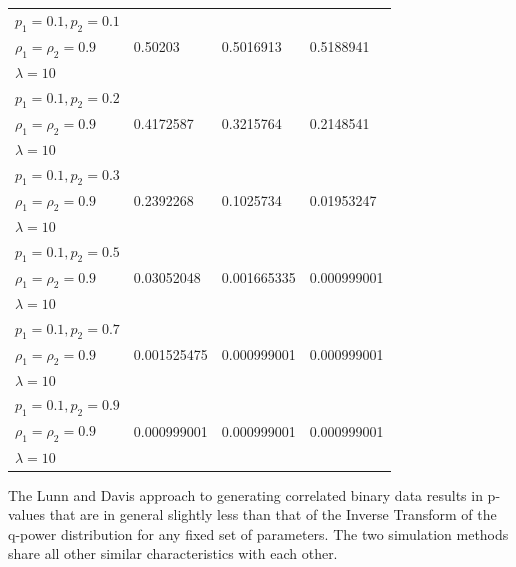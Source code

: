 \documentclass[12pt,oneside]{report}
\theoremstyle{definition}
\theoremstyle{mystyle}
\begin{document}
\begin{landscape}
\begin{center}
\begin{longtable}{|l|l|l| l|}
		$ p_{1}=0.1,p_{2}=0.1$&&&\\
		$ \rho_{1}=\rho_{2}=0.9 $ &0.50203 & 0.5016913&0.5188941\\
		$\lambda=10$&&&\\ \hline
		$ p_{1}=0.1,p_{2}=0.2$&&&\\
		$ \rho_{1}=\rho_{2}=0.9 $ &0.4172587 & 0.3215764& 0.2148541\\
		$\lambda=10$&&&\\ \hline
		$ p_{1}=0.1,p_{2}=0.3$&&&\\
		$ \rho_{1}=\rho_{2}=0.9 $ &0.2392268 &0.1025734& 0.01953247\\
		$\lambda=10$&&&\\ \hline
		$ p_{1}=0.1,p_{2}=0.5$&&&\\
		$ \rho_{1}=\rho_{2}=0.9 $ &0.03052048 &0.001665335&0.000999001\\
		$\lambda=10$&&&\\ \hline
		$ p_{1}=0.1,p_{2}=0.7$&&&\\
		$ \rho_{1}=\rho_{2}=0.9 $ &0.001525475 & 0.000999001& 0.000999001\\
		$\lambda=10$&&&\\ \hline
		$ p_{1}=0.1,p_{2}=0.9$&&&\\
		$ \rho_{1}=\rho_{2}=0.9 $ & 0.000999001&0.000999001&0.000999001\\
		$\lambda=10$&&&\\ \hline
	\end{longtable}
\end{center}
\end{landscape}

The  Lunn and Davis  approach to generating correlated binary data results in p-values that are in general slightly  less than that of  the Inverse Transform of the q-power distribution for any fixed set of parameters. The two simulation methods share all  other similar characteristics with each other.

\newpage
\end{document}
